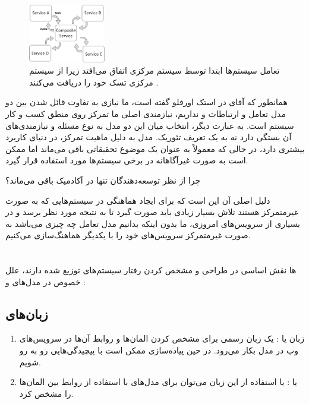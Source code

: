 \documentclass[a4paper]{article}
\begin{document}
\begin{figure}[H]
    \centering
    \includegraphics[width=0.3\textwidth]{orchestration.jpeg}
    \caption{تعامل سیستم‌ها ابتدا توسط سیستم مرکزی اتفاق می‌افتد زیرا از سیستم
    مرکزی تسک خود را دریافت می‌کنند \cite{stackoverflow}.}
    \label{fig:atmDiagram}
\end{figure}

همانطور که آقای  \cite{karelhusaOpinion} در استک اورفلو گفته است،
ما نیازی به تفاوت قائل شدن بین دو مدل تعامل و ارتباطات  و
 نداریم، نیازمندی اصلی ما تمرکز روی منطق کسب و کار سیستم است.
به عبارت دیگر، انتخاب میان این دو مدل به نوع مسئله و نیازمندی‌های آن بستگی دارد
نه به یک تعریف تئوریک. مدل  به دلیل ماهیت تمرکز، در دنیای
 کاربرد بیشتری دارد، در حالی که  معمولاً به عنوان یک
موضوع تحقیقاتی باقی می‌ماند اما ممکن است به صورت غیرآگاهانه در برخی سیستم‌ها
مورد استفاده قرار گیرد.

چرا  از نظر توسعه‌دهندگان تنها در آکادمیک باقی می‌ماند؟

دلیل اصلی آن این است که برای ایجاد هماهنگی در سیستم‌هایی که به صورت غیرمتمرکز
هستند تلاش بسیار زیادی باید صورت گیرد تا به نتیجه مورد نظر برسد و در بسیاری از
سرویس‌های امروزی، ما بدون اینکه بدانیم مدل تعامل  چه چیزی
می‌باشد به صورت غیرمتمرکز سرویس‌های خود را با یکدیگر هماهنگ‌سازی می‌کنیم.

\section{}

ها نقش اساسی در طراحی و مشخص کردن رفتار سیستم‌های توزیع شده دارند، علل
خصوص در مدل‌های  و :

\subsection{زبان‌های }

\begin{enumerate}
    \item زبان  یا : یک زبان رسمی برای مشخص کردن المان‌ها و روابط آن‌ها در سرویس‌های
    وب در مدل  بکار می‌رود. در حین پیاده‌سازی ممکن است با
    پیچیدگی‌هایی رو به رو شویم.
    \item {} یا : با استفاده از این زبان
    می‌توان برای مدل‌های  با استفاده از 
    روابط بین المان‌ها را مشخص کرد.
\end{enumerate}
\end{document}
